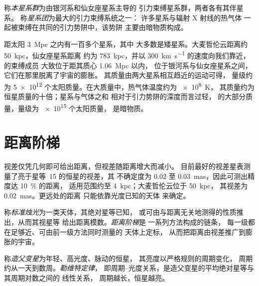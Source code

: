 \begin{definition}\label{def:b3:milky-way-galaxies:groups}
称\emph{本星系群}为由银河系和仙女座星系主导的
引力束缚星系群，两者各有其伴星系。
称\emph{星系团}为最大的引力束缚系统之一：
许多星系与辐射 X 射线的热气体
一起被束缚在共同的引力势阱中，该势阱
主要由暗物质构成。
\end{definition}

距太阳 \qty{3}{Mpc} 之内有一百多个星系，其中
大多数是矮星系。大麦哲伦云距离约 \qty{50}{kpc}，仙女座星系距离
约为 \qty{783}{kpc}，并以 \qty{300}{km.s^{-1}} 的速度向我们靠近，的束缚成员
大致位于距其质心 \qty{1.06}{Mpc} 以内，
位于银河系与仙女座星系之间，它们在那里脱离了宇宙的膨胀。
其质量由两大星系相互趋近的运动可得，
量级约为 \num{5e12} 个太阳质量。在大质量中，热气体温度约为 \qty{e8}{K}，
其质量约为恒星质量的十倍；星系与气体之和
相对于引力势阱的深度而言过轻，
的大部分质量，量级为 \num{e15} 个太阳质量，
是暗物质。

\section{距离阶梯}\label{sec:b3:milky-way-galaxies:ladder}

视差仅凭几何即可给出距离，但视差随距离增大而减小。
目前最好的视差星表测量了亮于星等~15 的恒星的视差，其
不确定度为 0.02 至 \qty{0.03}{mas}，因此可测出精度达 \qty{10}{\percent} 的距离，
适用范围约至 \qty{4}{kpc}；大麦哲伦云位于 \qty{50}{kpc}，
其视差为 \qty{0.02}{mas}。更远处的距离
只能依靠光度已知的天体
来确定。

\begin{definition}\label{def:b3:milky-way-galaxies:ladder}
称\emph{标准烛光}为一类天体，其绝对星等已知，
或可由与距离无关地测得的性质推出，从而其视星等
给出距离模数。\emph{距离阶梯}是
一系列方法构成的链条，
每一级都在足够近、可由前一级方法同时测量的
天体上定标，
从而把距离由视差推广到膨胀的宇宙。
\end{definition}

\begin{definition}\label{def:b3:milky-way-galaxies:cepheid}
称\emph{造父变星}为年轻、高光度、脉动的恒星，
其亮度以严格规则的周期变化，
周期约从一天到数周。\emph{勒维特定律}，
即周期–光度关系，是造父变星的平均绝对星等与其周期对数之间的
线性关系，
周期越长，恒星越亮。
\end{definition}


